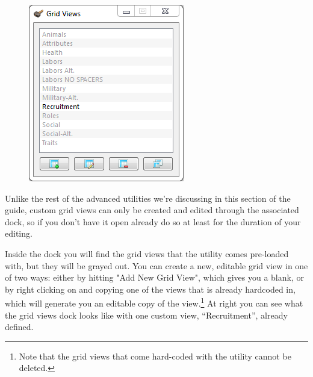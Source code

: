 \documentclass[]{article}
\begin{document}
\begin{figure}
\vspace{-20pt}
  \begin{center}
    \includegraphics[width=\linewidth]{Sec3Fig13}
  \end{center}
\vspace{-50pt}
\end{figure}
Unlike the rest of the advanced utilities we're discussing in this section of the guide, custom grid
views can only be created and edited through the associated dock, so if you don't have it open already do
so at least for the duration of your editing.

Inside the dock you will find the grid views that the utility comes pre-loaded with, but they will be
grayed out. You can create a new, editable grid view in one of two ways: either by hitting "Add New Grid
View", which gives you a blank, or by right clicking on and copying one of the views that is already
hardcoded in, which will generate you an editable copy of the view.\footnote{Note that the grid views
that come hard-coded with the utility cannot be deleted.} At right you can see what the grid views dock
looks like with one custom view, ``Recruitment'', already defined.
\end{document}
